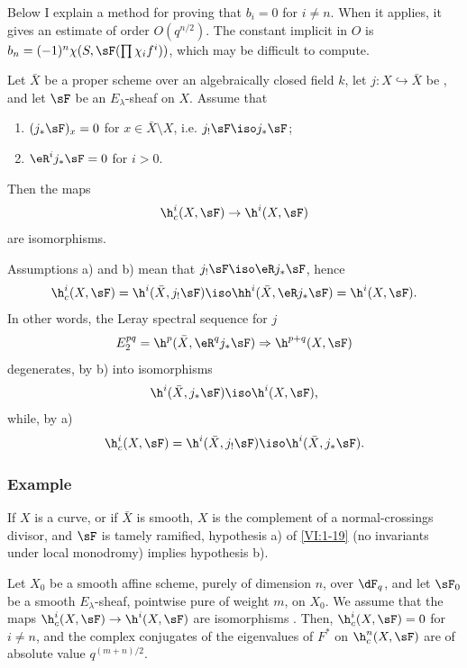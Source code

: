 Below I explain a method for proving that $b_i=0$ for $i\ne n$. 
When it applies, it gives an estimate of order $O(q^{n/2})$. The constant 
implicit in $O$ is $b_n=(-1)^n \chi(S,\sF(\prod \chi_i f^i))$, which may 
be difficult to compute. 





\begin{proposition_}\label{VI:1-19}
Let $\bar X$ be a proper scheme over an algebraically closed field $k$, 
let $j:X\hookrightarrow \bar X$ be , and let $\sF$ be an $E_\lambda$-sheaf 
on $X$. Assume that 
\begin{enumerate}[\indent a)]
  \item $(j_\ast\sF)_x = 0$ for $x\in \bar X\setminus X$, i.e. 
    $j_!\sF\iso j_\ast\sF$; 
  \item $\eR^i j_\ast \sF = 0$ for $i>0$.
\end{enumerate}
Then the maps 
\[
  \h_c^i(X,\sF) \to \h^i(X,\sF)
\]
are isomorphisms. 
\end{proposition_}

Assumptions a) and b) mean that $j_! \sF \iso \eR j_\ast \sF$, hence 
\[
  \h_c^i(X,\sF) = \h^i(\bar X,j_!\sF) \iso \hh^i(\bar X,\eR j_\ast \sF) = \h^i(X,\sF) \text{.}
\]
In other words, the Leray spectral sequence for $j$ 
\[
  E_2^{pq} = \h^p(\bar X,\eR^q j_\ast \sF) \Rightarrow \h^{p+q}(X,\sF) 
\]
degenerates, by b) into isomorphisms 
\[
  \h^i(\bar X,j_\ast\sF) \iso \h^i(X,\sF) \text{,}
\]
while, by a) 
\[
  \h_c^i(X,\sF) = \h^i(\bar X,j_!\sF) \iso \h^i(\bar X,j_\ast\sF) \text{.}
\]





\subsubsection{Example}\label{VI:1-19-1}

If $X$ is a curve, or if $\bar X$ is smooth, $X$ is the complement of a 
normal-crossings divisor, and $\sF$ is tamely ramified, 
hypothesis a) of \ref{VI:1-19} (no invariants under local monodromy) 
implies hypothesis b). 





\begin{proposition_}\label{VI:1-20}
Let $X_0$ be a smooth affine scheme, purely of dimension $n$, over $\dF_q$, and let 
$\sF_0$ be a smooth $E_\lambda$-sheaf, pointwise pure of weight $m$, on $X_0$. We 
assume that the maps $\h_c^i(X,\sF) \to \h^i(X,\sF)$ are 
isomorphisms . Then, $\h_c^i(X,\sF) = 0$ for $i\ne n$, and 
the complex conjugates of the eigenvalues of $F^\ast$ on $\h_c^n(X,\sF)$ 
are of absolute value $q^{(m+n)/2}$. 
\end{proposition_}

